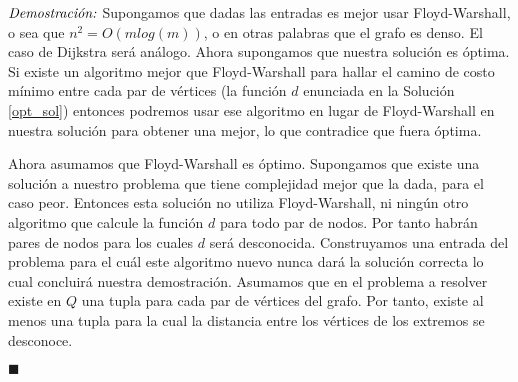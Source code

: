 \documentclass[10pt]{amsart}
\theoremstyle{definition}
\numberwithin{equation}{section}
\newcommand{\lqqd}{{\small $\blacksquare$}}
\newcommand{\Proof}[2]{{\vspace{1em} $\emph{Demostración:}$ \textbf{#1} #2 \lqqd \vspace{1em}}}
\begin{document}
	\Proof{}{
		Supongamos que dadas las entradas es mejor usar Floyd-Warshall, o sea que $n^2 = O(m log(m))$, o en otras palabras que el grafo es denso.	El caso de Dijkstra ser\'a an\'alogo. Ahora supongamos que nuestra soluci\'on es \'optima. Si existe un algoritmo mejor que Floyd-Warshall para hallar el camino de costo m\'inimo entre cada par de v\'ertices (la funci\'on $d$ enunciada en la Soluci\'on \ref{opt_sol}) entonces podremos usar ese algoritmo en lugar de Floyd-Warshall en nuestra soluci\'on para obtener una mejor, lo que contradice que fuera \'optima. 
		
		Ahora asumamos que Floyd-Warshall es \'optimo. Supongamos que existe una soluci\'on a nuestro problema que tiene complejidad mejor que la dada, para el caso peor. Entonces esta soluci\'on no utiliza Floyd-Warshall, ni ning\'un otro algoritmo que calcule la funci\'on $d$ para todo par de nodos. Por tanto habr\'an pares de nodos para los cuales $d$ ser\'a desconocida. Construyamos una entrada del problema para el cu\'al este algoritmo nuevo nunca dar\'a la soluci\'on correcta lo cual concluir\'a nuestra demostraci\'on. Asumamos que en el problema a resolver existe en $Q$ una tupla para cada par de v\'ertices del grafo. Por tanto, existe al menos una tupla para la cual la distancia entre los v\'ertices de los extremos se desconoce.  
		
	}

\medskip










\bigskip
	



	
\end{document}
